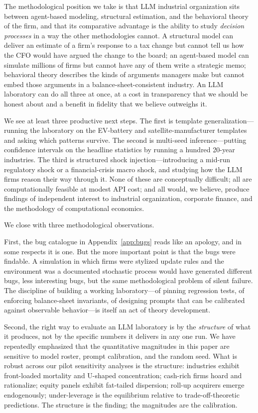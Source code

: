 \documentclass[11pt]{article}
\begin{document}
The methodological position we take is that LLM industrial organization
sits between agent-based modeling, structural estimation, and the
behavioral theory of the firm, and that its comparative advantage is
the ability to study \emph{decision processes} in a way the other
methodologies cannot. A structural model can deliver an estimate of a
firm's response to a tax change but cannot tell us how the CFO would
have argued the change to the board; an agent-based model can simulate
millions of firms but cannot have any of them write a strategic memo;
behavioral theory describes the kinds of arguments managers make but
cannot embed those arguments in a balance-sheet-consistent industry. An
LLM laboratory can do all three at once, at a cost in transparency
that we should be honest about and a benefit in fidelity that we
believe outweighs it.

We see at least three productive next steps. The first is template
generalization---running the laboratory on the EV-battery and
satellite-manufacturer templates and asking which patterns survive.
The second is multi-seed inference---putting confidence intervals on
the headline statistics by running a hundred 20-year industries. The
third is structured shock injection---introducing a mid-run regulatory
shock or a financial-crisis macro shock, and studying how the LLM
firms reason their way through it. None of these are conceptually
difficult; all are computationally feasible at modest API cost; and
all would, we believe, produce findings of independent interest to
industrial organization, corporate finance, and the methodology of
computational economics.

We close with three methodological observations.

First, the bug catalogue in Appendix~\ref{app:bugs} reads like an
apology, and in some respects it is one. But the more important point
is that the bugs were findable. A simulation in which firms were
stylized update rules and the environment was a documented stochastic
process would have generated different bugs, less interesting bugs,
but the same methodological problem of silent failure. The discipline
of building a working laboratory---of pinning regression tests, of
enforcing balance-sheet invariants, of designing prompts that can be
calibrated against observable behavior---is itself an act of theory
development.

Second, the right way to evaluate an LLM laboratory is by the
\emph{structure} of what it produces, not by the specific numbers it
delivers in any one run. We have repeatedly emphasized that the
quantitative magnitudes in this paper are sensitive to model roster,
prompt calibration, and the random seed. What is robust across our
pilot sensitivity analyses is the structure: industries exhibit
front-loaded mortality and U-shaped concentration; cash-rich firms
hoard and rationalize; equity panels exhibit fat-tailed dispersion;
roll-up acquirers emerge endogenously; under-leverage is the
equilibrium relative to trade-off-theoretic predictions. The structure
is the finding; the magnitudes are the calibration.
\end{document}
